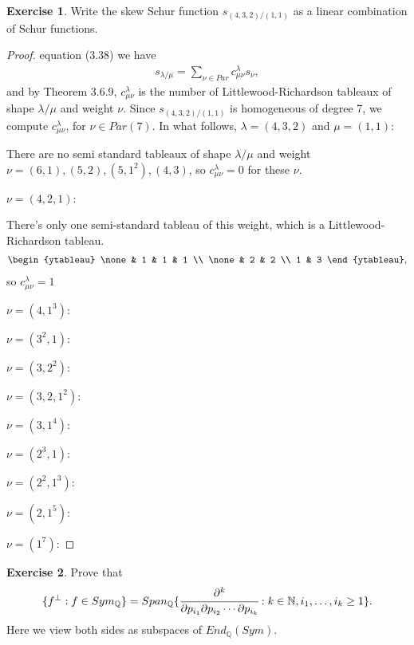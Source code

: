 \documentclass[8pt]{extarticle}
\newcommand{\set}[1]{\{#1\}}
\newcommand{\N}{\mathbb{N}}
\newcommand{\Q}{\mathbb{Q}}
\newcommand{\<}{\langle}
\renewcommand{\>}{\rangle}
\theoremstyle{definition}
\newtheorem{exercise}{Exercise}
\begin{document}
\newpage
\begin{exercise}
  Write the skew Schur function $s_{(4,3,2)/(1,1)}$ as a linear combination of Schur functions. 
\end{exercise}
\begin{proof}
   equation (3.38) we have 
  \begin{align*}
    s_{\lambda/\mu} = \sum\limits_{\nu \in Par} c_{\mu \nu}^{\lambda} s_{\nu},
  \end{align*}
  and by Theorem 3.6.9, $c_{\mu \nu}^{\lambda}$ is the number of Littlewood-Richardson tableaux of shape $\lambda/\mu$ and weight $\nu$.
  Since $s_{(4,3,2)/(1,1)}$ is homogeneous of degree 7, we compute $c_{\mu \nu}^{\lambda}$, for $\nu \in Par(7)$. In what follows, $\lambda = (4,3,2)$ and $\mu = (1,1)$:

  There are no semi standard tableaux of shape $\lambda/\mu$ and weight $\nu = (6,1), (5,2), (5,1^2), (4,3)$, so $c_{\mu \nu}^{\lambda} = 0$ for these $\nu$.
  
  $\nu =  (4,2,1)$:

  There's only one semi-standard tableau of this weight, which is a Littlewood-Richardson tableau.
  \begin{align*}
    \begin{ytableau}
      \none & 1 & 1 & 1 \\
      \none & 2 & 2 \\
      1 & 3 
    \end{ytableau},
  \end{align*}
  so $c_{\mu \nu}^{\lambda} = 1$
  
  $\nu = (4,1^3)$:
  
  $\nu = (3^2,1)$:
  
  $\nu = (3,2^2)$:
  
  $\nu = (3,2,1^2)$:
  
  $\nu = (3,1^4)$:
  
  $\nu = (2^3,1)$:
  
  $\nu = (2^2,1^3)$:
  
  $\nu = (2,1^5)$:
  
  $\nu = (1^7)$:


\end{proof}

\begin{exercise}
  Prove that
  \begin{align*}
    \set{f^{\perp} : f \in Sym_\Q} = Span_{\Q}\set{\cfrac{\partial^k}{\partial p_{i_1} \partial p_{i_2} \cdots \partial p_{i_k}} : k \in \N, i_1, \dots, i_k \geq 1 }.
  \end{align*}
  Here we view both sides as subspaces of $End_{\Q}(Sym)$.
\end{exercise}
\end{document}
